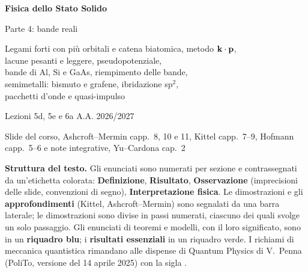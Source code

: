 \documentclass[11pt,a4paper]{article}
\newcommand{\corso}{Fisica dello Stato Solido}
\newcommand{\argomento}{Parte 4: bande reali}
\newcommand{\lezioni}{Lezioni 5d, 5e e 6a}
\begin{document}
\hypersetup{pageanchor=false}
\begin{titlepage}
\centering
\vspace*{5.2cm}
{\fontsize{24}{30}\selectfont\bfseries \corso\par}
\vspace{1.1cm}
{\Large \argomento\par}
\vspace{0.9cm}
{\large Legami forti con più orbitali e catena biatomica, metodo $\mathbf k\cdot\mathbf p$,\\ lacune pesanti e leggere, pseudopotenziale,\\ bande di Al, Si e GaAs, riempimento delle bande,\\ semimetalli: bismuto e grafene, ibridazione sp$^2$,\\ pacchetti d'onde e quasi-impulso\par}
\vspace{0.35cm}
{\color{black!60} \lezioni{} \textperiodcentered{} A.A. 2026/2027\par}
\vspace{0.2cm}
{\small\color{black!60} Slide del corso, Ashcroft--Mermin capp.~8, 10 e 11, Kittel capp.~7--9, Hofmann capp.~5--6 e note integrative, Yu--Cardona cap.~2\par}
\vspace{2.6cm}
\begin{minipage}{0.86\linewidth}\small\setlength{\parskip}{0pt}
\textbf{Struttura del testo.} Gli enunciati sono numerati per sezione e contrassegnati da
un'etichetta colorata: \textbf{\color{cdef}Definizione}, \textbf{\color{cris}Risultato},
\textbf{\color{coss}Osservazione} (imprecisioni delle slide,
convenzioni di segno), \textbf{\color{cint}Interpretazione fisica}. Le dimostrazioni e gli
\textbf{\color{cappr}approfondimenti} (Kittel, Ashcroft--Mermin) sono segnalati da una barra
laterale; le dimostrazioni sono divise in passi numerati, ciascuno dei quali svolge un solo
passaggio. Gli enunciati di teoremi e modelli, con il loro significato, sono in un
\textbf{\color{csez}riquadro blu}; i \textbf{\color{cris}risultati essenziali} in un riquadro verde. I richiami di meccanica
quantistica rimandano alle dispense di Quantum Physics di V.~Penna (PoliTo, versione del 14 aprile 2025) con la sigla .
\end{minipage}
\vfill
\end{titlepage}
\hypersetup{pageanchor=true}
\end{document}
